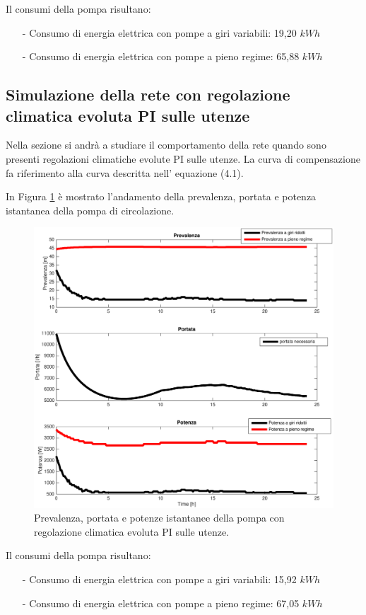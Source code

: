 \documentclass[laurea,oneside,11pt]{USiena_tesiLM}
\begin{document}
Il consumi della pompa risultano:
\begin{itemize}
\item[-] Consumo di energia elettrica con pompe a giri variabili: 19,20 $kWh$ 
\item[-] Consumo di energia elettrica con pompe a pieno regime: 65,88 $kWh$
\end{itemize}

\subsection{Simulazione della rete con regolazione climatica evoluta PI sulle utenze}
Nella sezione si andrà a studiare il comportamento della rete quando sono presenti regolazioni climatiche evolute PI sulle utenze.  La curva di compensazione fa riferimento alla curva descritta nell' equazione (4.1).

In Figura \ref{fig:sim_PID} è mostrato l'andamento della prevalenza, portata e potenza istantanea della pompa di circolazione.

\begin{figure}[!ht]
\centering
\includegraphics[width=\textwidth]{figure/sim_PID} 
\caption{Prevalenza, portata e potenze istantanee della pompa con regolazione climatica evoluta PI sulle utenze.}
\label{fig:sim_PID}
\end{figure}

Il consumi della pompa risultano:
\begin{itemize}
\item[-] Consumo di energia elettrica con pompe a giri variabili: 15,92 $kWh$ 
\item[-] Consumo di energia elettrica con pompe a pieno regime: 67,05 $kWh$
\end{itemize}
\end{document}
